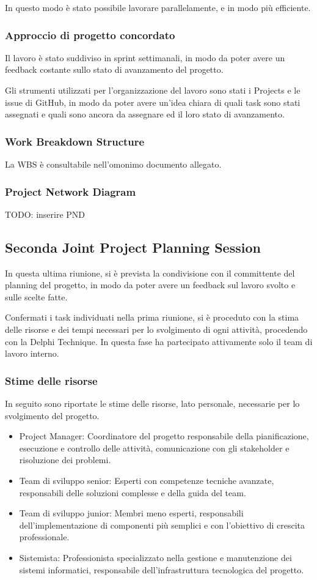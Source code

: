 In questo modo è stato possibile lavorare parallelamente, e in modo più efficiente.

\subsubsection{Approccio di progetto concordato}
Il lavoro è stato suddiviso in sprint settimanali, in modo da poter avere un feedback costante sullo stato di avanzamento
del progetto.

Gli strumenti utilizzati per l'organizzazione del lavoro sono stati i Projects e le issue di GitHub, in modo da poter
avere un'idea chiara di quali task sono stati assegnati e quali sono ancora da assegnare ed il loro stato di avanzamento.

\subsubsection{Work Breakdown Structure}
La WBS è consultabile nell'omonimo documento allegato.

\subsubsection{Project Network Diagram}
TODO: inserire PND

\subsection{Seconda Joint Project Planning Session}
In questa ultima riunione, si è prevista la condivisione con il committente del planning del progetto, in modo da
poter avere un feedback sul lavoro svolto e sulle scelte fatte.

Confermati i task individuati nella prima riunione, si è proceduto con la stima delle risorse e dei tempi necessari
per lo svolgimento di ogni attività, procedendo con la Delphi Technique. In questa fase ha partecipato attivamente
solo il team di lavoro interno.

\subsubsection{Stime delle risorse}
In seguito sono riportate le stime delle risorse, lato personale, necessarie per lo svolgimento del progetto.

\begin{itemize}
    \item Project Manager: Coordinatore del progetto responsabile della pianificazione, esecuzione e controllo delle attività, comunicazione con gli stakeholder e risoluzione dei problemi.
    \item Team di sviluppo senior: Esperti con competenze tecniche avanzate, responsabili delle soluzioni complesse e della guida del team.
    \item Team di sviluppo junior: Membri meno esperti, responsabili dell'implementazione di componenti più semplici e con l'obiettivo di crescita professionale.
    \item Sistemista: Professionista specializzato nella gestione e manutenzione dei sistemi informatici, responsabile dell'infrastruttura tecnologica del progetto.
\end{itemize}

